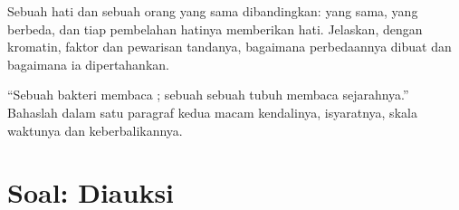 \begin{exercise}[$\star\star\star$]\label{exo:b1:expression-control:11}
Sebuah  hati dan sebuah  orang yang sama dibandingkan: 
yang sama,  yang berbeda, dan tiap pembelahan  hatinya
memberikan  hati. Jelaskan, dengan kromatin, faktor dan pewarisan
tandanya, bagaimana perbedaannya dibuat dan bagaimana ia dipertahankan.
\end{exercise}

\begin{exercise}[$\star\star\star$]\label{exo:b1:expression-control:12}
``Sebuah bakteri membaca ; sebuah  sebuah tubuh membaca
sejarahnya.'' Bahaslah dalam satu paragraf kedua macam kendalinya,
isyaratnya, skala waktunya dan keberbalikannya.
\end{exercise}

\section{Soal: Diauksi}

